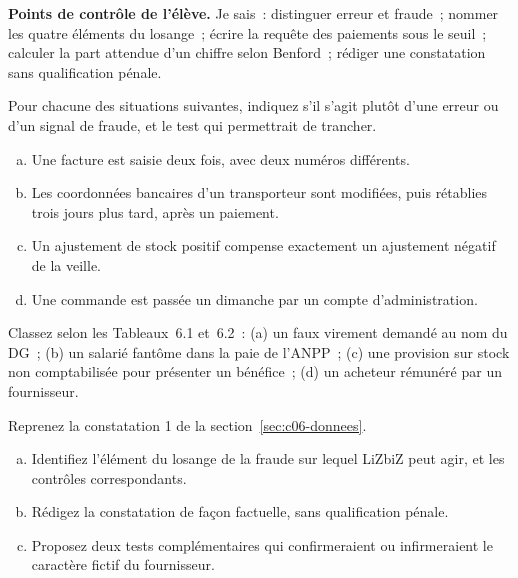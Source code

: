 \begin{boxinfo}
\textbf{Points de contrôle de l'élève.} Je sais~: distinguer erreur et
fraude~; nommer les quatre éléments du losange~; écrire la requête des
paiements sous le seuil~; calculer la part attendue d'un chiffre selon
Benford~; rédiger une constatation sans qualification pénale.
\end{boxinfo}

\bigskip

\begin{boxexo}[title={\ding{45}\quad Exercice~6.1. Erreur ou fraude~? \niveaubase}]
Pour chacune des situations suivantes, indiquez s'il s'agit plutôt d'une
erreur ou d'un signal de fraude, et le test qui permettrait de trancher.
\begin{enumerate}[(a)]
    \item Une facture est saisie deux fois, avec deux numéros différents.
    \item Les coordonnées bancaires d'un transporteur sont modifiées, puis
          rétablies trois jours plus tard, après un paiement.
    \item Un ajustement de stock positif compense exactement un ajustement
          négatif de la veille.
    \item Une commande est passée un dimanche par un compte d'administration.
\end{enumerate}
\end{boxexo}

\begin{boxexo}[title={\ding{45}\quad Exercice~6.2. Classer \niveaubase}]
Classez selon les Tableaux~6.1 et~6.2~: (a) un faux virement demandé au nom
du DG~; (b) un salarié fantôme dans la paie de l'ANPP~; (c) une provision
sur stock non comptabilisée pour présenter un bénéfice~; (d) un acheteur
rémunéré par un fournisseur.
\end{boxexo}

\begin{boxexo}[title={\ding{45}\quad Exercice~6.3. Le triangle de TRANSLOG SERVICES \niveaumoyen}]
Reprenez la constatation 1 de la section~\ref{sec:c06-donnees}.
\begin{enumerate}[(a)]
    \item Identifiez l'élément du losange de la fraude sur lequel LiZbiZ peut
          agir, et les contrôles correspondants.
    \item Rédigez la constatation de façon factuelle, sans qualification
          pénale.
    \item Proposez deux tests complémentaires qui confirmeraient ou
          infirmeraient le caractère fictif du fournisseur.
\end{enumerate}
\end{boxexo}

